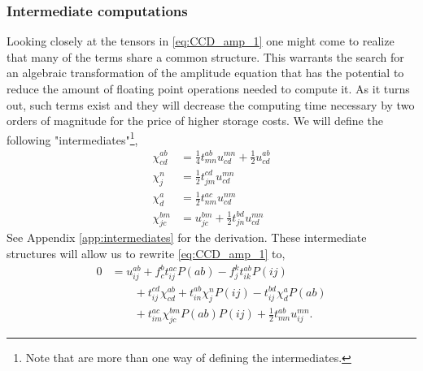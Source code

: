 \documentclass[
    a4paper, aps, twocolumn, floatfix, superscriptaddress,
    nofootinbib]{revtex4-1}
\newcommand{\1}{\mathds{1}}
\begin{document}
        \subsubsection{Intermediate computations}
            Looking closely at the tensors in \autoref{eq:CCD_amp_1} one might
            come to realize that many of the terms share a common structure.
            This warrants the search for an algebraic transformation of the
            amplitude equation that has the potential to reduce the amount of
            floating point operations needed to compute it. As it turns out,
            such terms exist and they will decrease the computing time necessary
            by two orders of magnitude for the price of higher storage costs.
            We will define the following "intermediates"\footnote{Note that are
            more than one way of defining the intermediates.},
            \begin{align}
                \label{eq:intermediate1}
                \chi^{ab}_{cd}
                &= \frac{1}{4}t^{ab}_{mn} u^{mn}_{cd}
                + \frac{1}{2}u^{ab}_{cd} \\
                \label{eq:intermediate2}
                \chi^n_j &= \frac{1}{2}t^{cd}_{jm} u^{mn}_{cd} \\
                \label{eq:intermediate3}
                \chi^a_d &= \frac{1}{2} t^{ac}_{nm} u^{nm}_{cd} \\
                \label{eq:intermediate4}
                \chi^{bm}_{jc}
                &= u^{bm}_{jc} + \frac{1}{2}t^{bd}_{jn}u^{mn}_{cd}
            \end{align}
            See Appendix \ref{app:intermediates} for the derivation.  These
            intermediate structures will allow us to rewrite
            \autoref{eq:CCD_amp_1} to,
            \begin{equation}
                \begin{aligned}
                    0 &= u^{ab}_{ij} + f^b_c t^{ac}_{ij}P(ab)
                    - f^k_jt^{ab}_{ik}P(ij) \\
                    &\qquad
                    + t^{cd}_{ij}\chi^{ab}_{cd} + t^{ab}_{in}\chi^n_jP(ij)
                    - t^{bd}_{ij}\chi^a_dP(ab) \\
                    &\qquad
                    + t^{ac}_{im}\chi^{bm}_{jc}P(ab)P(ij)
                    + \frac{1}{2}t^{ab}_{mn}u^{mn}_{ij}.
                \end{aligned}
            \end{equation}
\end{document}
